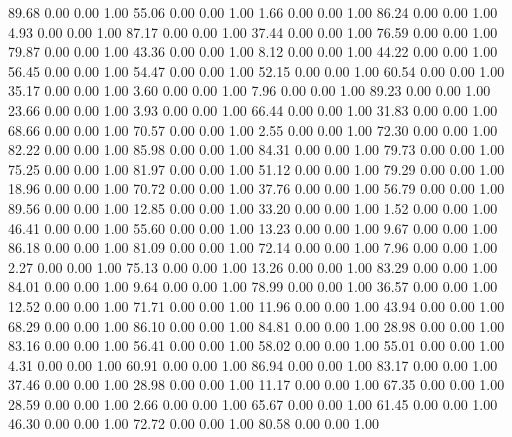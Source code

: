    89.68   0.00   0.00   1.00
   55.06   0.00   0.00   1.00
    1.66   0.00   0.00   1.00
   86.24   0.00   0.00   1.00
    4.93   0.00   0.00   1.00
   87.17   0.00   0.00   1.00
   37.44   0.00   0.00   1.00
   76.59   0.00   0.00   1.00
   79.87   0.00   0.00   1.00
   43.36   0.00   0.00   1.00
    8.12   0.00   0.00   1.00
   44.22   0.00   0.00   1.00
   56.45   0.00   0.00   1.00
   54.47   0.00   0.00   1.00
   52.15   0.00   0.00   1.00
   60.54   0.00   0.00   1.00
   35.17   0.00   0.00   1.00
    3.60   0.00   0.00   1.00
    7.96   0.00   0.00   1.00
   89.23   0.00   0.00   1.00
   23.66   0.00   0.00   1.00
    3.93   0.00   0.00   1.00
   66.44   0.00   0.00   1.00
   31.83   0.00   0.00   1.00
   68.66   0.00   0.00   1.00
   70.57   0.00   0.00   1.00
    2.55   0.00   0.00   1.00
   72.30   0.00   0.00   1.00
   82.22   0.00   0.00   1.00
   85.98   0.00   0.00   1.00
   84.31   0.00   0.00   1.00
   79.73   0.00   0.00   1.00
   75.25   0.00   0.00   1.00
   81.97   0.00   0.00   1.00
   51.12   0.00   0.00   1.00
   79.29   0.00   0.00   1.00
   18.96   0.00   0.00   1.00
   70.72   0.00   0.00   1.00
   37.76   0.00   0.00   1.00
   56.79   0.00   0.00   1.00
   89.56   0.00   0.00   1.00
   12.85   0.00   0.00   1.00
   33.20   0.00   0.00   1.00
    1.52   0.00   0.00   1.00
   46.41   0.00   0.00   1.00
   55.60   0.00   0.00   1.00
   13.23   0.00   0.00   1.00
    9.67   0.00   0.00   1.00
   86.18   0.00   0.00   1.00
   81.09   0.00   0.00   1.00
   72.14   0.00   0.00   1.00
    7.96   0.00   0.00   1.00
    2.27   0.00   0.00   1.00
   75.13   0.00   0.00   1.00
   13.26   0.00   0.00   1.00
   83.29   0.00   0.00   1.00
   84.01   0.00   0.00   1.00
    9.64   0.00   0.00   1.00
   78.99   0.00   0.00   1.00
   36.57   0.00   0.00   1.00
   12.52   0.00   0.00   1.00
   71.71   0.00   0.00   1.00
   11.96   0.00   0.00   1.00
   43.94   0.00   0.00   1.00
   68.29   0.00   0.00   1.00
   86.10   0.00   0.00   1.00
   84.81   0.00   0.00   1.00
   28.98   0.00   0.00   1.00
   83.16   0.00   0.00   1.00
   56.41   0.00   0.00   1.00
   58.02   0.00   0.00   1.00
   55.01   0.00   0.00   1.00
    4.31   0.00   0.00   1.00
   60.91   0.00   0.00   1.00
   86.94   0.00   0.00   1.00
   83.17   0.00   0.00   1.00
   37.46   0.00   0.00   1.00
   28.98   0.00   0.00   1.00
   11.17   0.00   0.00   1.00
   67.35   0.00   0.00   1.00
   28.59   0.00   0.00   1.00
    2.66   0.00   0.00   1.00
   65.67   0.00   0.00   1.00
   61.45   0.00   0.00   1.00
   46.30   0.00   0.00   1.00
   72.72   0.00   0.00   1.00
   80.58   0.00   0.00   1.00
